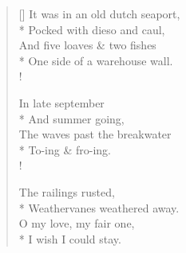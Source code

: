 \settowidth{\versewidth}{It was in an old dutch seaport}
\begin{verse}[\versewidth]
It was in an old dutch seaport,\\*
\vin Pocked with dieso and caul,\\
And five loaves \& two fishes\\*
\vin One side of a warehouse wall.\\!

In late september\\*
\vin And summer going,\\
The waves past the breakwater\\*
\vin To-ing \& fro-ing.\\!

The railings rusted,\\*
\vin Weathervanes weathered away.\\
O my love, my fair one,\\*
\vin I wish I could stay.
\end{verse}
